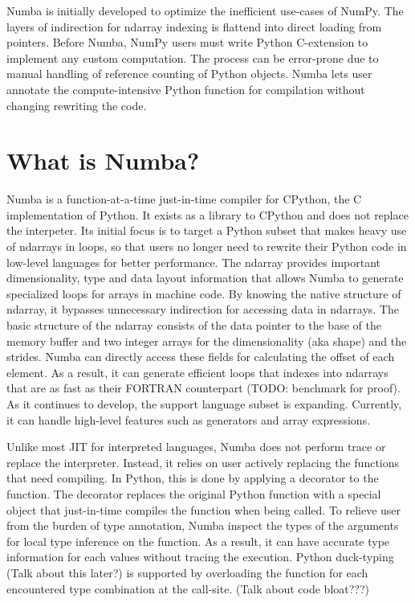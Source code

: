 \documentclass{acm_proc_article-sp}
\begin{document}
Numba is initially developed to optimize the inefficient use-cases of NumPy.
The layers of indirection for ndarray indexing is flattend into direct loading
from pointers.  Before Numba, NumPy users must write Python C-extension to
implement any custom computation.  The process can be error-prone due to manual
handling of reference counting of Python objects. Numba lets user annotate
the compute-intensive Python function for compilation without changing rewriting
the code.

\section{What is Numba?}

Numba is a function-at-a-time just-in-time compiler for CPython,
the C implementation of Python.
It exists as a library to CPython and does not replace the interpeter.
Its initial focus is to target a Python subset that makes heavy use of
ndarrays in loops, so that users no longer need to rewrite their Python code in
low-level languages for better performance.
The ndarray provides important dimensionality, type and data layout information
that allows Numba to generate specialized  loops for arrays in machine code.
By knowing the native structure of ndarray,
it bypasses unnecessary indirection for accessing data in ndarrays.
The basic structure of the ndarray consists of the data pointer to the base of
the memory buffer and two integer arrays for the dimensionality (aka shape) and
the strides. Numba can directly access these fields for calculating the offset
of each element.  As a result, it can generate efficient loops that indexes
into ndarrays that are as fast as their FORTRAN counterpart
(TODO: benchmark for proof). As it continues to develop, the support language
subset is expanding. Currently, it can handle high-level features such as
generators and array expressions.

Unlike most JIT for interpreted languages, Numba does not perform trace or
replace the interpreter.
Instead, it relies on user actively replacing the functions that need compiling.
In Python, this is done by applying a decorator to the function.
The decorator replaces the original Python function with a special object
that just-in-time compiles the function when being called.
To relieve user from the burden of type annotation, Numba inspect the types
of the arguments for local type inference on the function.
As a result, it can have accurate type information for each values without
tracing the execution.
Python duck-typing (Talk about this later?) is supported by overloading the
function for each encountered type combination at the call-site.
(Talk about code bloat???)
\end{document}
